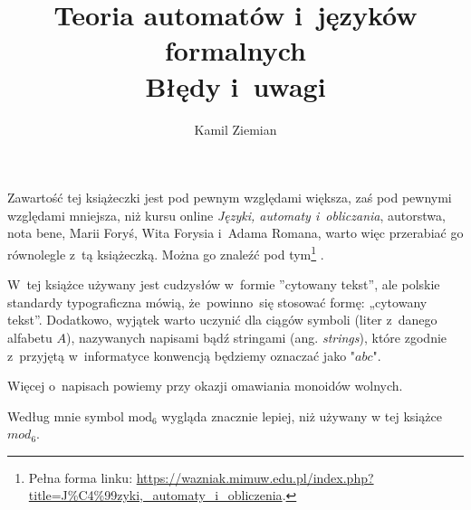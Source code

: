 \documentclass[a4paper,11pt]{article}
\title{Teoria automatów i~języków formalnych \\
  Błędy i~uwagi}
\author{Kamil Ziemian}
\begin{document}





\maketitle %









\start Zawartość tej książeczki jest pod pewnym względami większa, zaś
pod pewnymi względami mniejsza, niż kursu online \textit{Języki,
  automaty i~obliczania}, autorstwa, nota bene, Marii Foryś, Wita
Forysia i~Adama Romana, warto więc przerabiać go równolegle z~tą
książeczką. Można go znaleźć pod tym\footnote{Pełna forma linku:
  \href{https://wazniak.mimuw.edu.pl/index.php?title=J\%C4\%99zyki,\_automaty\_i\_obliczenia}
  {https://wazniak.mimuw.edu.pl/index.php?title=J\%C4\%99zyki,\_automaty\_i\_obliczenia}.}
.

\vspace{\spaceFour}



\start W~tej książce używany jest cudzysłów w~formie ”cytowany tekst”,
ale polskie standardy typograficzna mówią, że~powinno~się stosować
formę: „cytowany tekst”. Dodatkowo, wyjątek warto uczynić dla ciągów
symboli (liter z~danego alfabetu $A$), nazywanych napisami bądź
stringami (ang. \textit{strings}), które zgodnie z~przyjętą
w~informatyce konwencją będziemy oznaczać jako $\texttt{"} abc \texttt{"}$.

Więcej o~napisach powiemy przy okazji omawiania monoidów wolnych.






\start {} Według mnie symbol $\textrm{mod}_{ 6 }$ wygląda
znacznie lepiej, niż używany w tej książce $mod_{ 6 }$.
\end{document}
